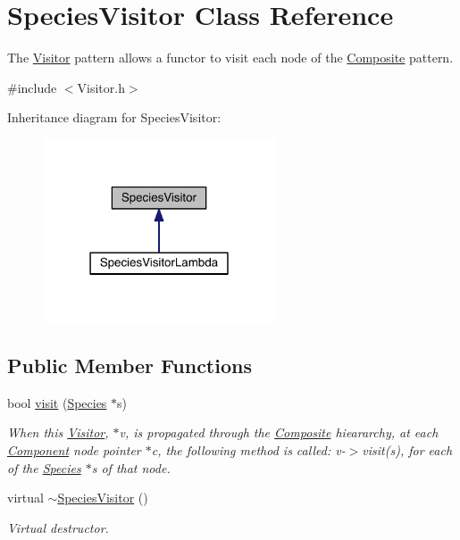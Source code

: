\hypertarget{classSpeciesVisitor}{\section{Species\+Visitor Class Reference}
\label{classSpeciesVisitor}
}


The \hyperlink{classVisitor}{Visitor} pattern allows a functor to visit each node of the \hyperlink{classComposite}{Composite} pattern.  




{\ttfamily \#include $<$Visitor.\+h$>$}



Inheritance diagram for Species\+Visitor\+:\nopagebreak
\begin{figure}[H]
\begin{center}
\leavevmode
\includegraphics[width=195pt]{classSpeciesVisitor__inherit__graph}
\end{center}
\end{figure}
\subsection*{Public Member Functions}
\begin{DoxyCompactItemize}
\item 
bool \hyperlink{classSpeciesVisitor_a1a3573d237d36307cc35e123e67875db}{visit} (\hyperlink{classSpecies}{Species} $\ast$s)
\begin{DoxyCompactList}\small\item\em When this \hyperlink{classVisitor}{Visitor}, $\ast$v, is propagated through the \hyperlink{classComposite}{Composite} hieararchy, at each \hyperlink{classComponent}{Component} node pointer $\ast$c, the following method is called\+: v-\/$>$visit(s), for each of the \hyperlink{classSpecies}{Species} $\ast$s of that node. \end{DoxyCompactList}\item 
virtual \hyperlink{classSpeciesVisitor_a07365fea8fc4e68898f68476d6da0064}{$\sim$\+Species\+Visitor} ()
\begin{DoxyCompactList}\small\item\em Virtual destructor. \end{DoxyCompactList}\end{DoxyCompactItemize}
